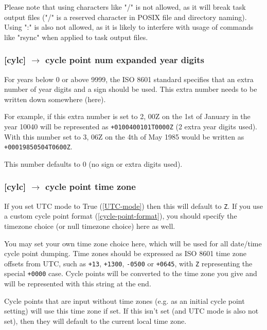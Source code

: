 Please note that using characters like "/" is not allowed, as it will break
task output files ("/" is a reserved character in POSIX file and directory
naming). Using ":" is also not allowed, as it is likely to interfere with
usage of commands like "rsync" when applied to task output files.

\subsubsection[cycle point num expanded year digits]{ [cylc] $\rightarrow$
cycle point num expanded year digits}
\label{cycle-point-num-expanded-year-digits}

For years below 0 or above 9999, the ISO 8601 standard specifies that an
extra number of year digits and a sign should be used. This extra number needs
to be written down somewhere (here).

For example, if this extra number is set to 2, 00Z on the 1st of January in
the year 10040 will be represented as \lstinline=+0100400101T0000Z= (2 extra
year digits used). With this number set to 3, 06Z on the 4th of May 1985 would
be written as \lstinline=+00019850504T0600Z=.

This number defaults to 0 (no sign or extra digits used).

\subsubsection[cycle point time zone]{ [cylc] $\rightarrow$
cycle point time zone}
\label{cycle-point-time-zone}

If you set UTC mode to True (\ref{UTC-mode}) then this will default to
\lstinline=Z=. If you use a custom cycle point format
(\ref{cycle-point-format}), you should specify the timezone choice (or null
timezone choice) here as well.

You may set your own time zone choice here, which will be used for all
date/time cycle point dumping. Time zones should be expressed as ISO 8601 time
zone offsets from UTC, such as \lstinline=+13=, \lstinline=+1300=,
\lstinline=-0500= or \lstinline=+0645=, with \lstinline=Z= representing the
special \lstinline=+0000= case. Cycle points will be converted to the time
zone you give and will be represented with this string at the end.

Cycle points that are input without time zones (e.g. as an initial cycle point
setting) will use this time zone if set. If this isn't set (and UTC mode is
also not set), then they will default to the current local time zone.


